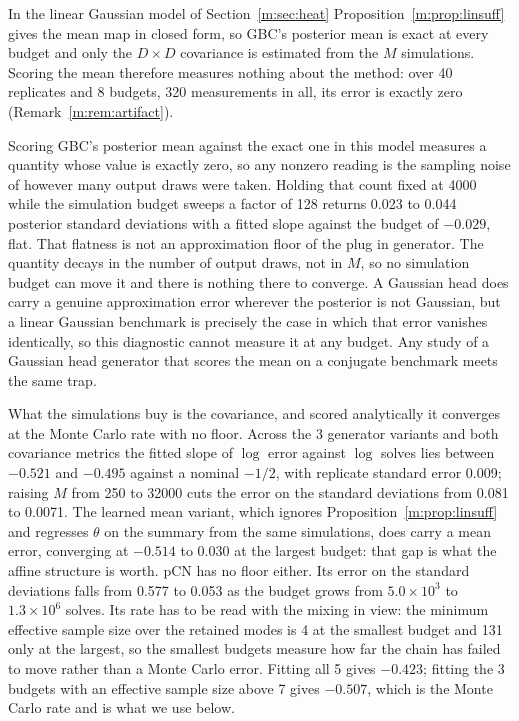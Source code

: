 In the linear Gaussian model of Section~\ref{m:sec:heat} Proposition~\ref{m:prop:linsuff} gives the mean map in closed form, so GBC's posterior mean is exact at every budget and only the $D\times D$ covariance is estimated from the $M$ simulations. Scoring the mean therefore measures nothing about the method: over 40 replicates and 8 budgets, 320 measurements in all, its error is exactly zero (Remark~\ref{m:rem:artifact}).

\begin{remark}\label{m:rem:artifact}
Scoring GBC's posterior mean against the exact one in this model measures a quantity whose value is exactly zero, so any nonzero reading is the sampling noise of however many output draws were taken. Holding that count fixed at 4000 while the simulation budget sweeps a factor of 128 returns 0.023 to 0.044 posterior standard deviations with a fitted slope against the budget of $-0.029$, flat. That flatness is not an approximation floor of the plug in generator. The quantity decays in the number of output draws, not in $M$, so no simulation budget can move it and there is nothing there to converge. A Gaussian head does carry a genuine approximation error wherever the posterior is not Gaussian, but a linear Gaussian benchmark is precisely the case in which that error vanishes identically, so this diagnostic cannot measure it at any budget. Any study of a Gaussian head generator that scores the mean on a conjugate benchmark meets the same trap.
\end{remark}

What the simulations buy is the covariance, and scored analytically it converges at the Monte Carlo rate with no floor. Across the 3 generator variants and both covariance metrics the fitted slope of $\log$ error against $\log$ solves lies between $-0.521$ and $-0.495$ against a nominal $-1/2$, with replicate standard error 0.009; raising $M$ from 250 to 32000 cuts the error on the standard deviations from 0.081 to 0.0071. The learned mean variant, which ignores Proposition~\ref{m:prop:linsuff} and regresses $\theta$ on the summary from the same simulations, does carry a mean error, converging at $-0.514$ to 0.030 at the largest budget: that gap is what the affine structure is worth. pCN has no floor either. Its error on the standard deviations falls from 0.577 to 0.053 as the budget grows from $5.0\times10^{3}$ to $1.3\times10^{6}$ solves. Its rate has to be read with the mixing in view: the minimum effective sample size over the retained modes is 4 at the smallest budget and 131 only at the largest, so the smallest budgets measure how far the chain has failed to move rather than a Monte Carlo error. Fitting all 5 gives $-0.423$; fitting the 3 budgets with an effective sample size above 7 gives $-0.507$, which is the Monte Carlo rate and is what we use below.

